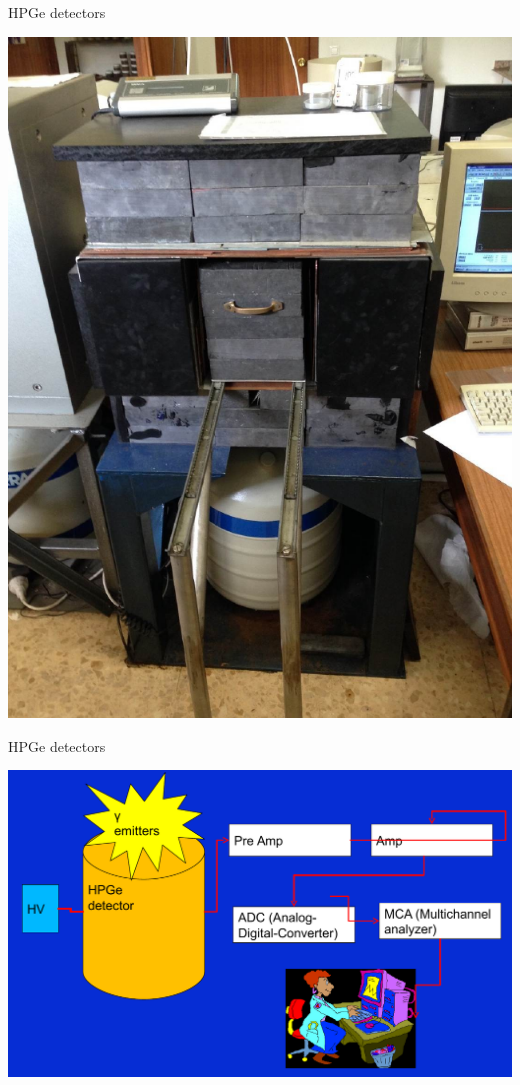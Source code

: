 \begin{frame}{HPGe detectors}

\centering
\includegraphics[scale=0.25]{figures/hpgelaruc2.png}

\end{frame}

\begin{frame}{HPGe detectors}


\centering
\includegraphics[scale=0.25]{figures/detectionsystem.png}

\end{frame}

